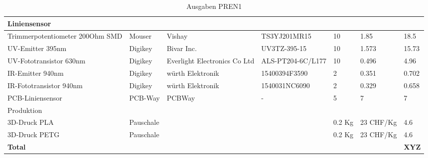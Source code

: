\documentclass[main.tex]{subfiles} %
\begin{document}
\begin{table}[h]
{\begin{tabular}{|p{3cm}|p{2.5cm}|p{2.5cm}|p{3cm}|p{1cm}|p{1.5cm}|p{1cm}|}
            \rowcolor{lightgray} Liniensensor &                    &                              &                         &                 &                           &                             \\ \hline
            Trimmerpotentiometer 200Ohm SMD   & Mouser             & Vishay                       & TS3YJ201MR15            & 10              & 1.85                      & 18.5                        \\ \hline
            UV-Emitter 395nm                  & Digikey            & Bivar Inc.                   & UV3TZ-395-15            & 10              & 1.573                     & 15.73                       \\ \hline
            UV-Fototransistor 630nm           & Digikey            & Everlight Electronics Co Ltd & ALS-PT204-6C/L177       & 10              & 0.496                     & 4.96                        \\ \hline
            IR-Emitter 940nm                  & Digikey            & würth Elektronik             & 15400394F3590           & 2               & 0.351                     & 0.702                       \\ \hline
            IR-Fototransistor 940nm           & Digikey            & würth Elektronik             & 1540031NC6090           & 2               & 0.329                     & 0.658                       \\ \hline
            PCB-Liniensensor                  & PCB-Way            & PCBWay                       & -                       & 5               & 7                         & 7                           \\ \hline
            \rowcolor{lightgray} Produktion   &                    &                              &                         &                 &                           &                             \\ \hline
            3D-Druck PLA                      & Pauschale          &                              &                         & 0.2 Kg          & 23 CHF/Kg                 & 4.6                         \\ \hline
            3D-Druck PETG                     & Pauschale          &                              &                         & 0.2 Kg          & 23 CHF/Kg                 & 4.6                         \\ \hline

            \textbf{Total}                    &                    &                              &                         &                 &                           & \textbf{XYZ}                \\ \hline
        \end{tabular}
    }
    \caption{Ausgaben PREN1}
    \label{tab:Ausgaben_PREN1}
\end{table}
\end{document}
